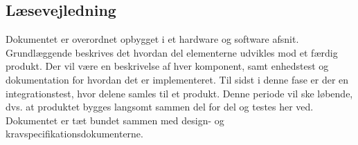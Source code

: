 \subsection{Læsevejledning}
Dokumentet er overordnet opbygget i et hardware og software afsnit. Grundlæggende beskrives det hvordan del elementerne udvikles mod et færdig produkt. Der vil være en beskrivelse af hver komponent, samt enhedstest og dokumentation for hvordan det er implementeret. Til sidst i denne fase er der en integrationstest, hvor delene samles til et produkt. Denne periode vil ske løbende, dvs. at produktet bygges langsomt sammen del for del og testes her ved. Dokumentet er tæt bundet sammen med design- og kravspecifikationsdokumenterne.